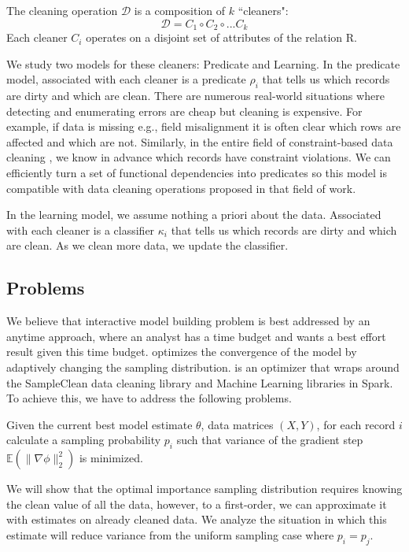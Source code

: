 \iffalse

The cleaning operation $\mathcal{D}$ is a composition of $k$ ``cleaners":
\[
\mathcal{D}= C_{1} \circ C_{2} \circ ... C_{k}
\]
Each cleaner $C_i$ operates on a disjoint set of attributes of the relation R.

We study two models for these cleaners: Predicate and Learning.
In the predicate model, associated with each cleaner is a predicate $\rho_i$ that 
tells us which records are dirty and which are clean.
There are numerous real-world situations where detecting and enumerating errors are cheap but cleaning is expensive.
For example, if data is missing e.g., field misalignment it is often clear which rows are affected and which are not.
Similarly, in the entire field of constraint-based data cleaning \cite{nadeef}, we know in advance which records have constraint violations.
We can efficiently turn a set of functional dependencies into predicates so this model is compatible with data cleaning operations proposed in that field of work.

In the learning model, we assume nothing a priori about the data.
Associated with each cleaner is a classifier $\kappa_i$ that 
tells us which records are dirty and which are clean.
As we clean more data, we update the classifier.

\subsection{Problems}
We believe that interactive model building problem is best addressed by an anytime approach, where an analyst has a time budget and wants a best effort result given this time budget.
\sys optimizes the convergence of the model by adaptively changing the sampling distribution.
\sys is an optimizer that wraps around the SampleClean data cleaning library and Machine Learning libraries in Spark.
To achieve this, we have to address the following problems.

\begin{problem}\label{imp-samp}\sloppy
Given the current best model estimate $\theta$, data matrices $(X,Y)$, for each record $i$ calculate a sampling probability $p_i$ such that variance of the gradient step $\mathbb{E}(\|\nabla\phi\|_{2}^{2})$ is minimized.
\end{problem}

We will show that the optimal importance sampling distribution requires knowing the clean value of all the data, however, to a first-order, we can approximate it with estimates on already cleaned data.
We analyze the situation in which this estimate will reduce variance from the uniform sampling case where $p_i = p_j$.


